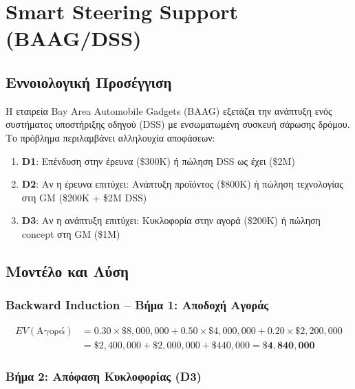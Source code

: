 \documentclass[a4paper,12pt]{article}
\begin{document}
\newpage
\section{Smart Steering Support (BAAG/DSS)}

\subsection{Εννοιολογική Προσέγγιση}

Η εταιρεία Bay Area Automobile Gadgets (BAAG) εξετάζει την ανάπτυξη ενός συστήματος υποστήριξης οδηγού (DSS) με ενσωματωμένη συσκευή σάρωσης δρόμου. Το πρόβλημα περιλαμβάνει αλληλουχία αποφάσεων:

\begin{enumerate}
    \item \textbf{D1}: Επένδυση στην έρευνα (\$300K) ή πώληση DSS ως έχει (\$2M)
    \item \textbf{D2}: Αν η έρευνα επιτύχει: Ανάπτυξη προϊόντος (\$800K) ή πώληση τεχνολογίας στη GM (\$200K + \$2M DSS)
    \item \textbf{D3}: Αν η ανάπτυξη επιτύχει: Κυκλοφορία στην αγορά (\$200K) ή πώληση concept στη GM (\$1M)
\end{enumerate}

\subsection{Μοντέλο και Λύση}

\subsubsection{Backward Induction -- Βήμα 1: Αποδοχή Αγοράς}

\begin{align}
EV(\text{Αγορά}) &= 0.30 \times \$8{,}000{,}000 + 0.50 \times \$4{,}000{,}000 + 0.20 \times \$2{,}200{,}000 \nonumber \\
&= \$2{,}400{,}000 + \$2{,}000{,}000 + \$440{,}000 = \mathbf{\$4{,}840{,}000}
\end{align}

\subsubsection{Βήμα 2: Απόφαση Κυκλοφορίας (D3)}
\end{document}
